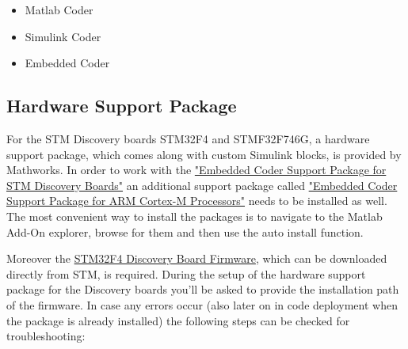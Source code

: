 \documentclass[a4paper]{article}
\begin{document}
\begin{itemize}
\item Matlab Coder
\item Simulink Coder
\item Embedded Coder
\end{itemize}

\subsection{Hardware Support Package}
For the STM Discovery boards STM32F4 and STMF32F746G, a hardware support package, which comes along with custom Simulink blocks, is provided by Mathworks. In order to work with the \href{https://de.mathworks.com/matlabcentral/fileexchange/43093-embedded-coder-support-package-for-stmicroelectronics-discovery-boards}{"Embedded Coder Support Package for STM Discovery Boards"} an additional support package called \href{https://de.mathworks.com/matlabcentral/fileexchange/43095-embedded-coder-support-package-for-arm-cortex-m-processors}{"Embedded Coder Support Package for ARM Cortex-M Processors"} needs to be installed as well. The most convenient way to install the packages is to navigate to the Matlab Add-On explorer, browse for them and then use the auto install function.

\bigskip Moreover the \href{http://www.st.com/en/embedded-software/stsw-stm32068.html}{STM32F4 Discovery Board Firmware}, which can be downloaded directly from STM, is required. During the setup of the hardware support package for the Discovery boards  you'll be asked to provide the installation path of the firmware. In case any errors occur (also later on in code deployment when the package is already installed) the following steps can be checked for troubleshooting:
\end{document}
